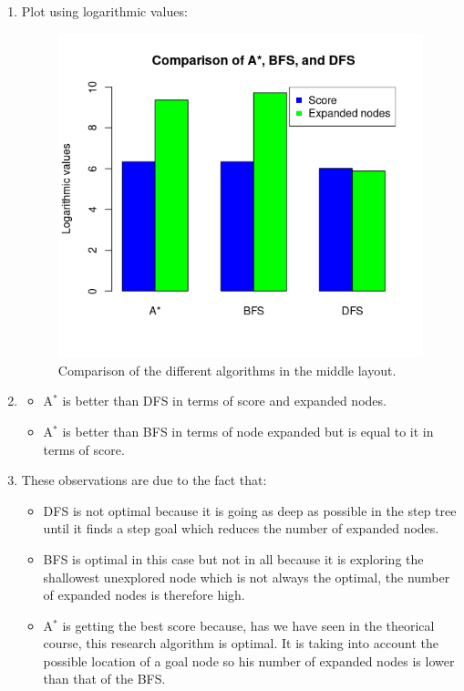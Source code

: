 \documentclass{article}
\begin{document}
\begin{enumerate}[label=\alph*.,leftmargin=1.35em]
    \item Plot using logarithmic values:\\
    \begin{figure}[H]
        \centering
        \includegraphics[scale=0.7]{q4_plot.png} 
        \caption{Comparison of the different algorithms in the middle layout.}
    \end{figure}
    \item
        \begin{itemize}
            \item A$^*$ is better than DFS in terms of score and expanded nodes.
            \item A$^*$ is better than BFS in terms of node expanded but is equal to it in terms of score.
        \end{itemize}
    \item These observations are due to the fact that:
        \begin{itemize}
            \item DFS is not optimal because it is going as deep as possible in the step tree until it finds a step goal which reduces the number of expanded nodes.
            \item BFS is optimal in this case but not in all because it is exploring the shallowest unexplored node which is not always the optimal, the number of expanded nodes is therefore high.  
            \item A$^*$ is getting the best score because, has we have seen in the theorical course, this research algorithm is optimal. It is taking into account the possible location of a goal node so his number of expanded nodes is lower than that of the BFS.
        \end{itemize}
\end{enumerate}


\end{document}
